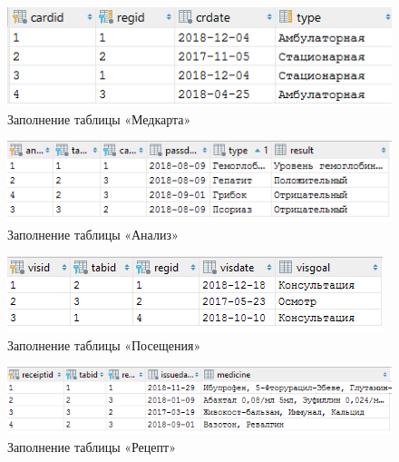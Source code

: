 \documentclass[14pt,a4paper,russian]{extreport}
\begin{document}
\vspace{0.00mm}

\begin{figure}[h!]
        \center\includegraphics[scale=1]{medcard}
        \caption{Заполнение таблицы «Медкарта»}
        \label{fig:medcard}
\end{figure}

\vspace{0.00mm}

\begin{figure}[h!]
        \center\includegraphics[scale=1]{analysis}
        \caption{Заполнение таблицы «Анализ»}
        \label{fig:analysis}
\end{figure}

\vspace{0.00mm}

\begin{figure}[h!]
        \center\includegraphics[scale=1]{visit}
        \caption{Заполнение таблицы «Посещения»}
        \label{fig:visit}
\end{figure}

\vspace{0.00mm}

\begin{figure}[h]
        \center\includegraphics[scale=1]{ireceipt}
        \caption{Заполнение таблицы «Рецепт»}
        \label{fig:ireceipt}
\end{figure}
\end{document}
